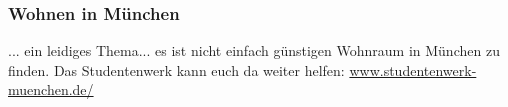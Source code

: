 \subsubsection{Wohnen in München}
... ein leidiges Thema... es ist nicht einfach günstigen Wohnraum in 
München zu finden. Das Studentenwerk kann euch da weiter helfen: \doublebreak
\url{www.studentenwerk-muenchen.de/} 